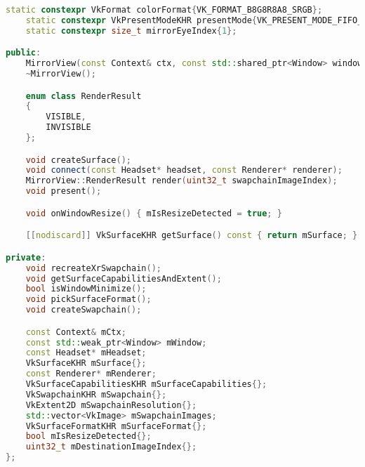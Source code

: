 \begin{itemize}
\begin{itemize}
\begin{lstlisting}[language=c++, caption=\texttt{MirroView} class (./engine/src/core/mirror\_view.h)]
    static constexpr VkFormat colorFormat{VK_FORMAT_B8G8R8A8_SRGB};
    static constexpr VkPresentModeKHR presentMode{VK_PRESENT_MODE_FIFO_KHR};
    static constexpr size_t mirrorEyeIndex{1};

public:
    MirrorView(const Context& ctx, const std::shared_ptr<Window> window);
    ~MirrorView();

    enum class RenderResult
    {
        VISIBLE,
        INVISIBLE
    };

    void createSurface();
    void connect(const Headset* headset, const Renderer* renderer);
    MirrorView::RenderResult render(uint32_t swapchainImageIndex);
    void present();

    void onWindowResize() { mIsResizeDetected = true; }

    [[nodiscard]] VkSurfaceKHR getSurface() const { return mSurface; }

private:
    void recreateXrSwapchain();
    void getSurfaceCapabilitiesAndExtent();
    bool isWindowMinimize();
    void pickSurfaceFormat();
    void createSwapchain();

    const Context& mCtx;
    const std::weak_ptr<Window> mWindow;
    const Headset* mHeadset;
    VkSurfaceKHR mSurface{};
    const Renderer* mRenderer;
    VkSurfaceCapabilitiesKHR mSurfaceCapabilities{};
    VkSwapchainKHR mSwapchain{};
    VkExtent2D mSwapchainResolution{};
    std::vector<VkImage> mSwapchainImages;
    VkSurfaceFormatKHR mSurfaceFormat{};
    bool mIsResizeDetected{};
    uint32_t mDestinationImageIndex{};
};
\end{lstlisting}
    \end{itemize}
\end{itemize}